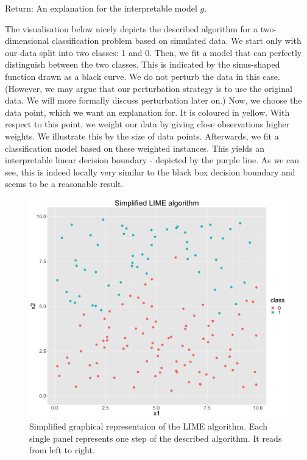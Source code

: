 \documentclass[
]{krantz}
\begin{document}
Return: An explanation for the interpretable model \(g\).

The visualisation below nicely depicts the described algorithm for a two-dimensional classification problem based on simulated data.
We start only with our data split into two classes: 1 and 0.
Then, we fit a model that can perfectly distinguish between the two classes.
This is indicated by the sinus-shaped function drawn as a black curve.
We do not perturb the data in this case.
(However, we may argue that our perturbation strategy is to use the original data.
We will more formally discuss perturbation later on.)
Now, we choose the data point, which we want an explanation for.
It is coloured in yellow.
With respect to this point, we weight our data by giving close observations higher weights.
We illustrate this by the size of data points.
Afterwards, we fit a classification model based on these weighted instances.
This yields an interpretable linear decision boundary - depicted by the purple line.
As we can see, this is indeed locally very similar to the black box decision boundary and seems to be a reasonable result.

\begin{figure}

{\centering \includegraphics[width=0.99\linewidth]{images/lime} 

}

\caption{Simplified graphical representaion of the LIME algorithm. Each single panel represents one step of the described algorithm. It reads from left to right.}\label{fig:unnamed-chunk-9}
\end{figure}
\end{document}
